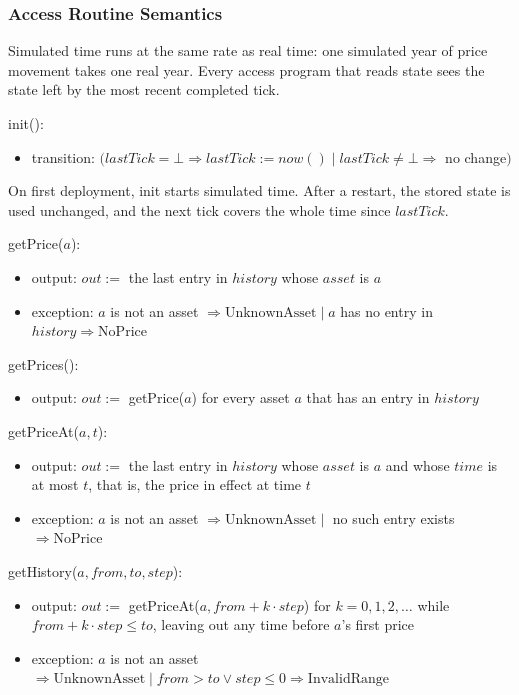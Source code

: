 \documentclass[12pt, titlepage]{article}
\begin{document}
\subsubsection{Access Routine Semantics}

\noindent Simulated time runs at the same rate as real time: one simulated
year of price movement takes one real year. Every access program that reads
state sees the state left by the most recent completed tick.

\medskip

\noindent init():
\begin{itemize}
\item transition: $(\mathit{lastTick} = \bot \Rightarrow \mathit{lastTick}
  := \mathit{now}() \mid \mathit{lastTick} \neq \bot \Rightarrow$ no
  change$)$
\end{itemize}

\noindent On first deployment, init starts simulated time. After a restart,
the stored state is used unchanged, and the next tick covers the whole time
since $\mathit{lastTick}$.

\medskip

\noindent getPrice($a$):
\begin{itemize}
\item output: $\mathit{out} :=$ the last entry in $\mathit{history}$ whose
  $\mathit{asset}$ is $a$
\item exception: $a$ is not an asset $\Rightarrow \mathrm{UnknownAsset} \mid
  a$ has no entry in $\mathit{history} \Rightarrow \mathrm{NoPrice}$
\end{itemize}

\noindent getPrices():
\begin{itemize}
\item output: $\mathit{out} :=$ getPrice($a$) for every asset $a$ that has
  an entry in $\mathit{history}$
\end{itemize}

\noindent getPriceAt($a, t$):
\begin{itemize}
\item output: $\mathit{out} :=$ the last entry in $\mathit{history}$ whose
  $\mathit{asset}$ is $a$ and whose $\mathit{time}$ is at most $t$, that is,
  the price in effect at time $t$
\item exception: $a$ is not an asset $\Rightarrow \mathrm{UnknownAsset} \mid$
  no such entry exists $\Rightarrow \mathrm{NoPrice}$
\end{itemize}

\noindent getHistory($a, \mathit{from}, \mathit{to}, \mathit{step}$):
\begin{itemize}
\item output: $\mathit{out} :=$ getPriceAt($a, \mathit{from} + k \cdot
  \mathit{step}$) for $k = 0, 1, 2, \ldots$ while $\mathit{from} + k \cdot
  \mathit{step} \leq \mathit{to}$, leaving out any time before $a$'s first
  price
\item exception: $a$ is not an asset $\Rightarrow \mathrm{UnknownAsset} \mid
  \mathit{from} > \mathit{to} \vee \mathit{step} \leq 0 \Rightarrow
  \mathrm{InvalidRange}$
\end{itemize}
\end{document}
